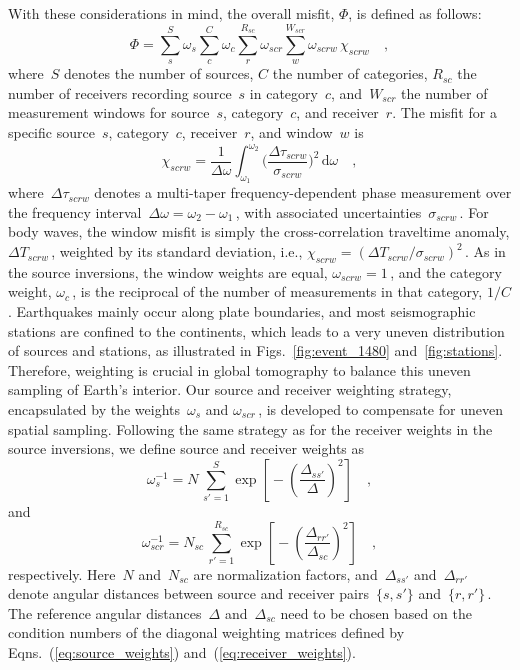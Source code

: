 \documentclass[extra,mreferee]{gji}
\begin{document}
With these considerations in mind,
the overall misfit, $\Phi$, is defined as follows:
\begin{equation}
\label{eq:misfit}
\Phi = \sum_{s}^{S} \omega_s \sum_{c}^{C} \omega_{c} \sum_{r}^{R_{sc}} \omega_{scr} \sum_{w}^{W_{scr}} \omega_{scrw}\, \chi_{scrw}
\quad ,
\end{equation}
where~$S$ denotes the number of sources, $C$ the number of categories,
$R_{sc}$ the number of receivers recording source~$s$ in category~$c$,
and~$W_{scr}$ the number of measurement windows for source~$s$, category~$c$,
and receiver~$r$.
The misfit for a specific source~$s$, category~$c$, receiver~$r$, and window~$w$ is
\begin{equation}
  \chi_{scrw} = \frac{1}{\Delta\omega}\int_{\omega_1}^{\omega_2} \Big( \frac {\Delta \tau_{scrw}} {\sigma_{scrw}} \Big)^2\, \mathrm{d}\omega
\quad ,
\end{equation}
where~$\Delta \tau_{scrw}$ denotes a multi-taper frequency-dependent phase measurement over the frequency interval~$\Delta\omega=\omega_2-\omega_1$\,,
with associated uncertainties~$\sigma_{scrw}$\,.
For body waves, the window misfit is simply the cross-correlation traveltime anomaly,
$\Delta T_{scrw}$\,, weighted by its standard deviation, i.e., $\chi_{scrw}=(\Delta T_{scrw}/\sigma_{scrw})^2$\,.
As in the source inversions,
the window weights are equal, $\omega_{scrw}=1$\,,
and the category weight, $\omega_c$\,, is the reciprocal of the number of measurements in that
category, $1/C$.
Earthquakes mainly occur along plate boundaries,
and most seismographic  stations are confined to the continents,
which leads to a very uneven distribution of sources and stations,
as illustrated in Figs.~\ref{fig:event_1480} and~\ref{fig:stations}.
Therefore, weighting is crucial in global tomography to balance this uneven sampling
of Earth's interior.
Our source and receiver weighting strategy,
encapsulated by the weights~$\omega_s$ and $\omega_{scr}$\,,
is developed to compensate for uneven spatial sampling.
Following the same strategy as for the receiver weights in the source inversions,
we define source and receiver weights as
\begin{equation}
\omega_{s}^{-1} = N\,\sum_{s'=1}^{S} \exp\left[\mbox{}-\left(\frac{\Delta_{ss'}}{\Delta}\right)^2\right]
\quad ,
\label{eq:source_weights}
\end{equation}
and
\begin{equation}
\omega_{scr}^{-1} = N_{sc}\,\sum_{r'=1}^{R_{sc}} \exp\left[\mbox{}-\left(\frac{\Delta_{rr'}}{\Delta_{sc}}\right)^2\right]
\quad ,
\label{eq:receiver_weights}
\end{equation}
respectively.
Here~$N$ and~$N_{sc}$ are normalization factors,
and~$\Delta_{ss'}$ and~$\Delta_{rr'}$ denote angular distances between source and receiver pairs~$\{s,s'\}$ and~$\{r,r'\}$\,.
The reference angular distances~$\Delta$ and~$\Delta_{sc}$ need to be chosen based on the condition 
numbers of the diagonal weighting matrices defined by Eqns.~(\ref{eq:source_weights}) and~(\ref{eq:receiver_weights}).
\end{document}
